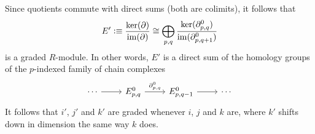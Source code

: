 \documentclass{article}
\begin{document}
\begin{rmk}
Since quotients commute with direct sums (both are colimits), it follows that
\begin{equation*}
E'\vcentcolon\equiv \frac{\mathrm{ker}(\partial)}{\mathrm{im}(\partial)}
  \cong
\bigoplus_{p,q} \frac{\mathrm{ker}(\partial^0_{p,q})}{\mathrm{im}(\partial^0_{p,q+1})}
\end{equation*}
is a graded $R$-module. In other words, $E'$ is a direct sum of the homology
groups of the $p$-indexed family of chain complexes
\begin{equation*}
\begin{tikzcd}
\cdots \arrow[r] & E_{p,q}^0 \arrow[r,"{\partial^0_{p,q}}"] & E_{p,q-1}^0 \arrow[r] & \cdots
\end{tikzcd}
\end{equation*}
It follows that $i'$, $j'$ and $k'$ are graded
whenever $i$, $j$ and $k$ are, where $k'$ shifts down in dimension the same way 
$k$ does.
\end{rmk}

\begin{comment}
\begin{defn}
We define
\begin{equation*}
E_{p,q}^0\defeq G_pC_{p+q}\defeq F_pC_{p+1}/F_{p-1}C_{p+q},
\end{equation*}

Since the differential preserves the filtration, we obtain from the differentials
well-defined $R$-homomorphisms functioning as the boundary maps in the chain complex

\end{defn}

\begin{defn}
The homology groups 
\begin{equation*}
E^1_{p,q}\defeq \mathrm{ker}(\partial^0_{p,q})/\mathrm{im}(\partial^0_{p,q+1})
\end{equation*}
form again a chain complex, with boundary maps $\partial^1_{p,q}:E^1_{p,q}\to
E^1_{p,q-1}$. Thus, this process may be repeated indefinitely.
\end{defn}
\end{comment}

\begin{comment}
\begin{lem}
Let $(C_\ast,\partial)$ be a filtered chain complex. Then there is a filtration
on the homology of $C_\ast$, given by
\begin{equation*}
F_pH_i(C_\ast)\defeq\{\alpha\in H_i(C_\ast)\mid \exists_{(x\in F_p C_i)}\,\alpha=[x]\}.
\end{equation*}
\end{lem}
\end{comment}
\end{document}
